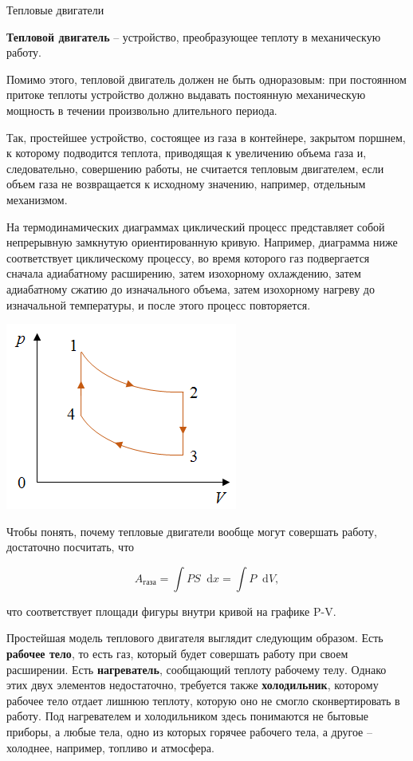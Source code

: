 \documentclass{article}
\newcommand{\definition}[2]{\begin{samepage} \textbf{#1} -- #2. \end{samepage} \par}
\renewcommand{\d}{\mathop{}\!\mathrm{d}}
\begin{document}
	\begin{section}{Тепловые двигатели}
		\definition{Тепловой двигатель}{устройство, преобразующее теплоту в механическую работу}

		Помимо этого, тепловой двигатель должен не быть одноразовым: при постоянном притоке теплоты устройство должно выдавать постоянную механическую мощность в течении произвольно длительного периода.

		Так, простейшее устройство, состоящее из газа в контейнере, закрытом поршнем, к которому подводится теплота, приводящая к увеличению объема газа и, следовательно, совершению работы, не считается тепловым двигателем, если объем газа не возвращается к исходному значению, например, отдельным механизмом.

		На термодинамических диаграммах циклический процесс представляет собой непрерывную замкнутую ориентированную кривую. Например, диаграмма ниже соответствует циклическому процессу, во время которого газ подвергается сначала адиабатному расширению, затем изохорному охлаждению, затем адиабатному сжатию до изначального объема, затем изохорному нагреву до изначальной температуры, и после этого процесс повторяется.

		\includegraphics{images/cycle1.png}

		Чтобы понять, почему тепловые двигатели вообще могут совершать работу, достаточно посчитать, что

		\begin{equation*}
			A_{\text{газа}} = \int P S \d x = \int P \d V,
		\end{equation*}

		что соответствует площади фигуры внутри кривой на графике P-V.

		Простейшая модель теплового двигателя выглядит следующим образом. Есть \textbf{рабочее тело}, то есть газ, который будет совершать работу при своем расширении. Есть \textbf{нагреватель}, сообщающий теплоту рабочему телу. Однако этих двух элементов недостаточно, требуется также \textbf{холодильник}, которому рабочее тело отдает лишнюю теплоту, которую оно не смогло сконвертировать в работу. Под нагревателем и холодильником здесь понимаются не бытовые приборы, а любые тела, одно из которых горячее рабочего тела, а другое -- холоднее, например, топливо и атмосфера.


\end{section}
\end{document}
